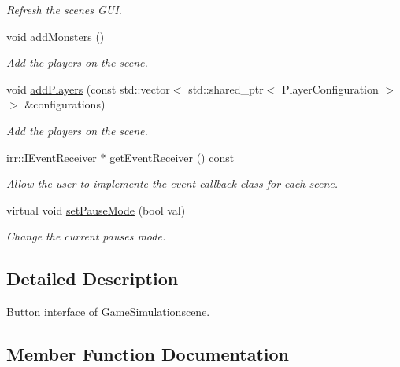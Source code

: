 \begin{DoxyCompactItemize}
\begin{DoxyCompactList}\small\item\em Refresh the scene\textquotesingle{}s G\+UI. \end{DoxyCompactList}\item 
\mbox{\label{classGameSimulationScene_a4ca88431209fea3a0050e0e5b63b60eb}} 
void \hyperlink{classGameSimulationScene_a4ca88431209fea3a0050e0e5b63b60eb}{add\+Monsters} ()
\begin{DoxyCompactList}\small\item\em Add the players on the scene. \end{DoxyCompactList}\item 
\mbox{\label{classGameSimulationScene_a5712662af6ebc293ba8a58e5a717a921}} 
void \hyperlink{classGameSimulationScene_a5712662af6ebc293ba8a58e5a717a921}{add\+Players} (const std\+::vector$<$ std\+::shared\+\_\+ptr$<$ Player\+Configuration $>$ $>$ \&configurations)
\begin{DoxyCompactList}\small\item\em Add the players on the scene. \end{DoxyCompactList}\item 
irr\+::\+I\+Event\+Receiver $\ast$ \hyperlink{classGameSimulationScene_a048b2a937caff3af7b4d54f8bd404ec1}{get\+Event\+Receiver} () const
\begin{DoxyCompactList}\small\item\em Allow the user to implemente the event callback class for each scene. \end{DoxyCompactList}\item 
virtual void \hyperlink{classGameSimulationScene_a34377bab69b7a81e50f3d2c42596c574}{set\+Pause\+Mode} (bool val)
\begin{DoxyCompactList}\small\item\em Change the current pause\textquotesingle{}s mode. \end{DoxyCompactList}\end{DoxyCompactItemize}


\subsection{Detailed Description}
\hyperlink{classButton}{Button} interface of Game\+Simulationscene. 

\subsection{Member Function Documentation}
\mbox{\label{classGameSimulationScene_a048b2a937caff3af7b4d54f8bd404ec1}} 
